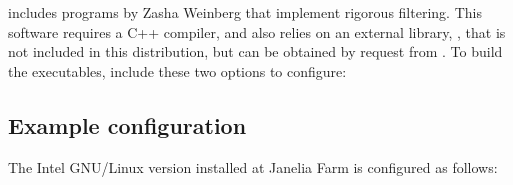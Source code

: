  includes programs by Zasha Weinberg that implement
rigorous filtering.  This software requires a C++ compiler, and also
relies on an external library, , that is not included
in this distribution, but can be obtained by request from
.
To build the executables, include these two options to configure:


\subsection{Example configuration}

The Intel GNU/Linux version installed at Janelia Farm is configured as
follows:







